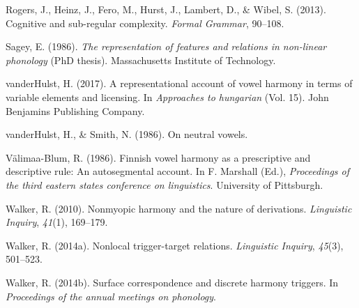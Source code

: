 \documentclass[,doc,floatsintext]{apa6}
\theoremstyle{definition}
\theoremstyle{definition}
\theoremstyle{definition}
\theoremstyle{remark}
\begin{document}
\hypertarget{ref-rogersetal2013}{}
Rogers, J., Heinz, J., Fero, M., Hurst, J., Lambert, D., \& Wibel, S.
(2013). Cognitive and sub-regular complexity. \emph{Formal Grammar},
90--108.

\hypertarget{ref-sagey1986}{}
Sagey, E. (1986). \emph{The representation of features and relations in
non-linear phonology} (PhD thesis). Massachusetts Institute of
Technology.

\hypertarget{ref-vdHulst2017}{}
vanderHulst, H. (2017). A representational account of vowel harmony in
terms of variable elements and licensing. In \emph{Approaches to
hungarian} (Vol. 15). John Benjamins Publishing Company.

\hypertarget{ref-vdHulstSmith1986}{}
vanderHulst, H., \& Smith, N. (1986). On neutral vowels.

\hypertarget{ref-valimaablum1986}{}
Välimaa-Blum, R. (1986). Finnish vowel harmony as a prescriptive and
descriptive rule: An autosegmental account. In F. Marshall (Ed.),
\emph{Proceedings of the third eastern states conference on
linguistics}. University of Pittsburgh.

\hypertarget{ref-walker2010}{}
Walker, R. (2010). Nonmyopic harmony and the nature of derivations.
\emph{Linguistic Inquiry}, \emph{41}(1), 169--179.

\hypertarget{ref-walkeroroquen}{}
Walker, R. (2014a). Nonlocal trigger-target relations. \emph{Linguistic
Inquiry}, \emph{45}(3), 501--523.

\hypertarget{ref-walker2014}{}
Walker, R. (2014b). Surface correspondence and discrete harmony
triggers. In \emph{Proceedings of the annual meetings on phonology}.
\end{document}
